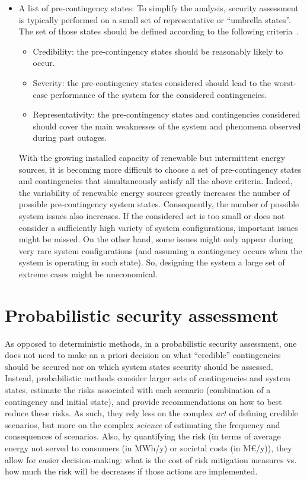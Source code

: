 \begin{itemize}
    \item A list of pre-contingency states: To simplify the analysis, security assessment is typically performed on a small set of representative or ``umbrella states''. The set of those states should be defined according to the following criteria~\cite{CIGREreviewOfTools}.
    \begin{itemize}
        \item Credibility: the pre-contingency states should be reasonably likely to occur.
        \item Severity: the pre-contingency states considered should lead to the worst-case performance of the system for the considered contingencies.
        \item Representativity: the pre-contingency states and contingencies considered should cover the main weaknesses of the system and phenomena observed during past outages.
    \end{itemize}
    With the growing installed capacity of renewable but intermittent energy sources, it is becoming more difficult to choose a set of pre-contingency states and contingencies that simultaneously satisfy all the above criteria. Indeed, the variability of renewable energy sources greatly increases the number of possible pre-contingency system states. Consequently, the number of possible system issues also increases. If the considered set is too small or does not consider a sufficiently high variety of system configurations, important issues might be missed. On the other hand, some issues might only appear during very rare system configurations (and assuming a contingency occurs when the system is operating in such state). So, designing the system a large set of extreme cases might be uneconomical.
\end{itemize}


\section{Probabilistic security assessment}
\label{sec:probabilisticSecurity}

As opposed to deterministic methods, in a probabilistic security assessment, one does not need to make an a priori decision on what ``credible'' contingencies should be secured nor on which system states security should be assessed. Instead, probabilistic methods consider larger sets of contingencies and system states, estimate the risks associated with each scenario (combination of a contingency and initial state), and provide recommendations on how to best reduce these risks. As such, they rely less on the complex \emph{art} of defining credible scenarios, but more on the complex \emph{science} of estimating the frequency and consequences of scenarios. Also, by quantifying the risk (in terms of average energy not served to consumers (in MWh/y) or societal costs (in M€/y)), they allow for easier decision-making: what is the cost of risk mitigation measures vs. how much the risk will be decreases if those actions are implemented.

